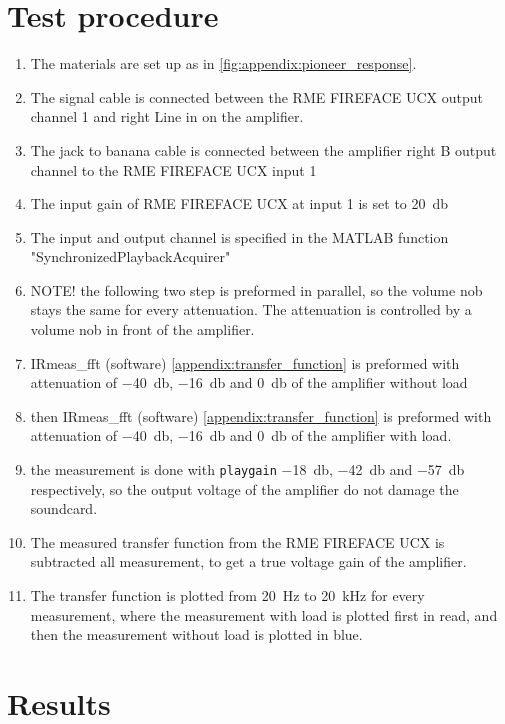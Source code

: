 \section*{Test procedure}


\begin{enumerate}
\item The materials are set up as in \autoref{fig:appendix:pioneer_response}.
\item The signal cable is connected between the RME FIREFACE UCX output channel 1 and right Line in on the amplifier.
\item The jack to banana cable is connected between the amplifier right B output channel to the  RME FIREFACE UCX input 1 
\item The input gain of RME FIREFACE UCX at input 1 is set to \SI{20}{\decibel}
\item The input and output channel is specified in the MATLAB function "SynchronizedPlaybackAcquirer" 
\item NOTE! the following two step is preformed in parallel, so the volume nob stays the same for every attenuation. The attenuation is controlled by a volume nob in front of the amplifier.
\item IRmeas_fft (software) \autoref{appendix:transfer_function} is preformed with attenuation of \SI{-40}{\decibel}, \SI{-16}{\decibel}  and  \SI{0}{\decibel} of the amplifier without load 
\item then IRmeas_fft (software) \autoref{appendix:transfer_function} is preformed with attenuation of \SI{-40}{\decibel}, \SI{-16}{\decibel} and \SI{0}{\decibel} of the amplifier with load. 
\item the measurement is done with \texttt{playgain} \SI{-18}{\decibel}, \SI{-42}{\decibel} and \SI{-57}{\decibel} respectively, so the output voltage of the amplifier do not damage the soundcard.
\item The measured transfer function from the RME FIREFACE UCX is subtracted all measurement, to get a true voltage gain of the amplifier.
\item The transfer function is plotted from \SI{20}{\hertz} to \SI{20}{\kilo\hertz} for every measurement, where the measurement with load is plotted first in read, and then the measurement without load is plotted in blue.

\end{enumerate}

\section*{Results}




